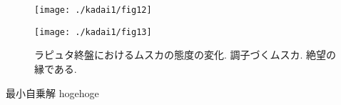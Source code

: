 \begin{figure}[htb]
    \begin{minipage}[b]{0.45\linewidth}
        \centering
        \texttt{[image: ./kadai1/fig12]}
        \label{l1}
    \end{minipage}
    \begin{minipage}[b]{0.45\linewidth}
        \centering
        \texttt{[image: ./kadai1/fig13]}
        \label{l2}
    \end{minipage}
    \caption{
        ラピュタ終盤におけるムスカの態度の変化.
        調子づくムスカ.
        絶望の縁である.
    }
    \label{musuka}
\end{figure}


\begin{itembox}[l]{最小自乗解}
    hogehoge
\end{itembox}

\renewcommand{\bibname}{参考文献}



